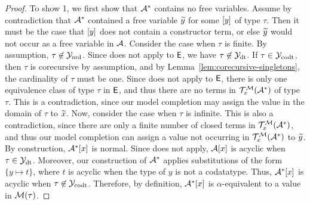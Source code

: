\begin{proof}
To show 1, we first show that $\mathcal{A}^\ast$ contains no free variables.
Assume by contradiction that $\mathcal{A}^\ast$ contained a free variable ${\widetilde{y}}$ for some $[y]$ of type $\tau$.
Then it must be the case that $[y]$ does not contain a constructor term,
or else ${\widetilde{y}}$ would not occur as a free variable in $\mathcal{A}$.
Consider the case when $\tau$ is finite.
By assumption, $\tau \not\in \mathcal{Y}_{\mathrm{ord}}$.
Since  does not apply to $\mathsf{E}$, we have $\tau \not\in \mathcal{Y}_{\mathrm{dt}}$.
If $\tau \in \mathcal{Y}_{\mathrm{codt}}$, then $\tau$ is corecursive by assumption, and by Lemma~\ref{lem:corecursive-singletons},
the cardinality of $\tau$ must be one.
Since  does not apply to $\mathsf{E}$,
there is only one equivalence class of type $\tau$ in $\mathsf{E}$,
and thus there are no terms in $\mathcal{T}^{\mathcal{M}}_x(\mathcal{A}^\ast)$ of type $\tau$.
This is a contradiction, since our model completion may assign the value in the domain of $\tau$ to ${\widetilde{x}}$.
Now, consider the case when $\tau$ is infinite.
This is also a contradiction,
since there are only a finite number of closed terms in $\mathcal{T}^{\mathcal{M}}_x(\mathcal{A}^\ast)$,
and thus our model completion can assign a value not occurring in $\mathcal{T}^{\mathcal{M}}_x(\mathcal{A}^\ast)$ to ${\widetilde{y}}$.
By construction, $\mathcal{A}^\ast [x]$ is normal.
Since  does not apply, $\mathcal{A} [x]$ is acyclic when $\tau \in \mathcal{Y}_{\mathrm{dt}}$.
Moreover, our construction of $\mathcal{A}^\ast$ applies substitutions of the form
$\{ y \mapsto t \}$, where $t$ is acyclic when the type of $y$ is not a codatatype.
Thus, $\mathcal{A}^\ast [x]$ is acyclic when $\tau \not\in \mathcal{Y}_{\mathrm{codt}}$.
Therefore, by definition, $\mathcal{A}^\ast [x]$ is $\alpha$-equivalent to a value in $\mathcal{M}( \tau )$.


\end{proof}
